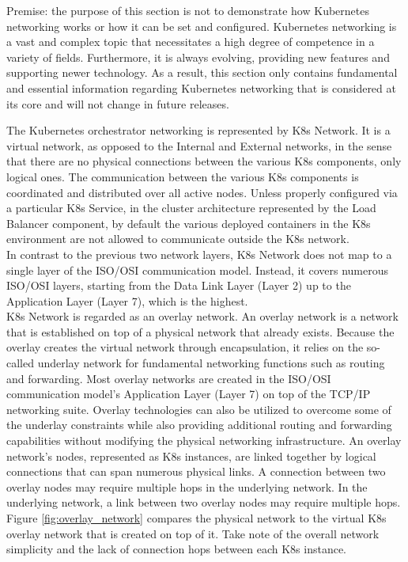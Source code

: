 Premise: the purpose of this section is not to demonstrate how Kubernetes
networking works or how it can be set and configured. Kubernetes networking is a
vast and complex topic that necessitates a high degree of competence in a variety
of fields. Furthermore, it is always evolving, providing new features and
supporting newer technology. As a result, this section only contains fundamental
and essential information regarding Kubernetes networking that is considered at
its core and will not change in future releases.

The Kubernetes orchestrator networking is represented by K8s Network. It is a virtual
network, as opposed to the Internal and External networks, in the sense that there
are no physical connections between the various K8s components, only logical
ones. The communication between the various K8s components is coordinated and distributed
over all active nodes. Unless properly configured via a particular K8s Service, in
the cluster architecture represented by the Load Balancer component, by default
the various deployed containers in the K8s environment are not allowed to
communicate outside the K8s network. \\ %
In contrast to the previous two network layers, K8s Network does not map to a single
layer of the ISO/OSI communication model. Instead, it covers numerous ISO/OSI layers,
starting from the Data Link Layer (Layer 2) up to the Application Layer (Layer 7),
which is the highest. \\ %
K8s Network is regarded as an overlay network. An overlay network is a network
that is established on top of a physical network that already exists. Because the
overlay creates the virtual network through encapsulation, it relies on the so-called
underlay network for fundamental networking functions such as routing and
forwarding. Most overlay networks are created in the ISO/OSI communication model's
Application Layer (Layer 7) on top of the TCP/IP networking suite. Overlay
technologies can also be utilized to overcome some of the underlay constraints
while also providing additional routing and forwarding capabilities without
modifying the physical networking infrastructure. An overlay network's nodes,
represented as K8s instances, are linked together by logical connections that can
span numerous physical links. A connection between two overlay nodes may require
multiple hops in the underlying network. In the underlying network, a link
between two overlay nodes may require multiple hops. Figure \ref{fig:overlay_network}
compares the physical network to the virtual K8s overlay network that is created
on top of it. Take note of the overall network simplicity and the lack of
connection hops between each K8s instance.

